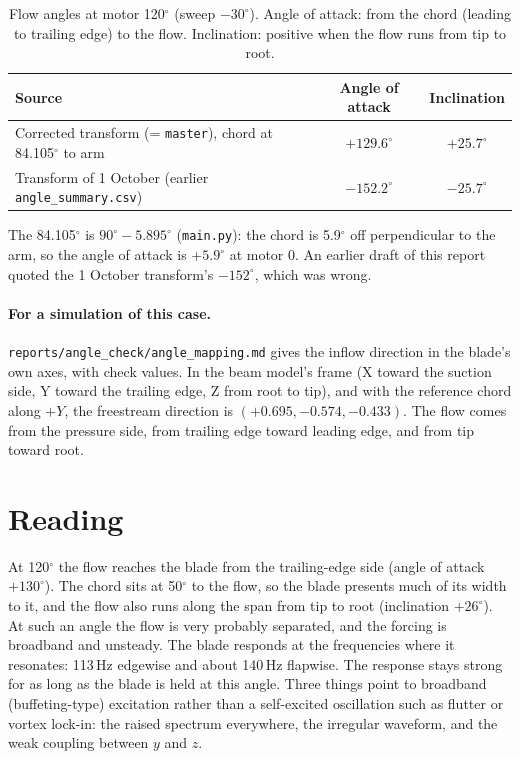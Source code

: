 \documentclass[11pt]{article}
\newcommand{\code}[1]{\texttt{#1}}
\begin{document}
\begin{table}[H]
  \centering
  \begin{tabular}{lcc}
    \toprule
    Source & Angle of attack & Inclination \\
    \midrule
    Corrected transform (= \code{master}), chord at 84.105$^\circ$ to arm & $+129.6^\circ$ & $+25.7^\circ$ \\
    Transform of 1 October (earlier \code{angle\_summary.csv}) & $-152.2^\circ$ & $-25.7^\circ$ \\
    \bottomrule
  \end{tabular}
  \caption{Flow angles at motor 120$^\circ$ (sweep $-30^\circ$). Angle of
  attack: from the chord (leading to trailing edge) to the flow.
  Inclination: positive when the flow runs from tip to root.}
  \label{tab:angles}
\end{table}

The 84.105$^\circ$ is $90^\circ - 5.895^\circ$ (\code{main.py}): the chord is
5.9$^\circ$ off perpendicular to the arm, so the angle of attack is
$+5.9^\circ$ at motor 0. An earlier draft of this report quoted the 1 October
transform's $-152^\circ$, which was wrong.

\paragraph{For a simulation of this case.} \code{reports/angle\_check/angle\_mapping.md}
gives the inflow direction in the blade's own axes, with check values. In
the beam model's frame (X toward the suction side, Y toward the trailing
edge, Z from root to tip), and with the reference chord along $+Y$, the
freestream direction is $(+0.695, -0.574, -0.433)$. The flow comes from the
pressure side, from trailing edge toward leading edge, and from tip toward
root.

\section{Reading}

At 120$^\circ$ the flow reaches the blade from the trailing-edge side
(angle of attack $+130^\circ$). The chord sits at 50$^\circ$ to the flow,
so the blade presents much of its width to it, and the flow also runs
along the span from tip to root (inclination $+26^\circ$). At such an angle
the flow is very probably separated,
and the forcing is broadband and unsteady. The blade responds at the
frequencies where it resonates: 113\,Hz edgewise and about 140\,Hz
flapwise. The response stays strong for as long as the blade is held at
this angle. Three things point to broadband (buffeting-type) excitation
rather than a self-excited oscillation such as flutter or vortex lock-in:
the raised spectrum everywhere, the irregular waveform, and the weak
coupling between $y$ and $z$.
\end{document}
